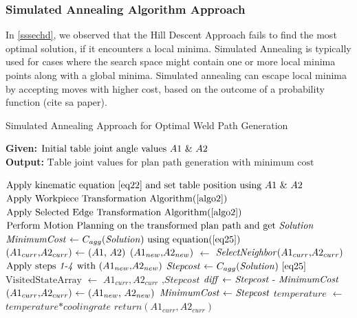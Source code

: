 \subsubsection{Simulated Annealing Algorithm Approach}
\label{sssec:sa}
In \ref{sssechd}, we observed that the Hill Descent Approach fails to find the most optimal solution, if it encounters a local minima. Simulated Annealing is typically used for cases where the search space might contain one or more local minima points along with a global minima. Simulated annealing can escape local minima by accepting moves with higher cost, based on the outcome of a probability function (cite sa paper). 
\begin{algorithm}[!ht]
	\caption{Simulated Annealing Approach for Optimal Weld Path Generation}
	\label{algo5}
	\textbf{Given:} $ \text{Initial table joint angle values \textit{$A1$} \& \textit{$A2$}}$ \\ 
	\textbf{Output:} $ \text{Table joint values for plan path generation with minimum cost}$
	
	\begin{algorithmic}[1]
		\State $\text{Apply kinematic equation \ref{eq22} and set table position using \textit{$A1$} \& \textit{$A2$}}$
		\State $\text{Apply Workpiece Transformation Algorithm(\ref{algo2})}$
		\State $\text{Apply Selected Edge Transformation Algorithm(\ref{algo2})}$
		\State $\text{Perform Motion Planning on the transformed plan path and get \textit{Solution}}$
		\State $\text{\textit{MinimumCost} $\gets$ $C_{agg}$(\textit{Solution}) using equation(\ref{eq25})}$
		\State $\text{(\textit{$A1_{curr}$},\textit{$A2_{curr}$}) $\gets$ (\textit{$A1$}, \textit{$A2$})}$
		\State $\text{(\textit{$A1_{new}$},\textit{$A2_{new}$})}$ $\gets$ $\text{\textit{SelectNeighbor}(\textit{$A1_{curr}$},\textit{$A2_{curr}$})}$
		\State $\text{Apply steps \textit{1-4} with (\textit{$A1_{new}$},\textit{$A2_{new}$})}$
		\State $\text{\textit{Stepcost} $\gets$ $C_{agg}$(\textit{Solution}) \ref{eq25}}$
		\State $\text{VisitedStateArray}$ $\gets$ $\textit{$A1_{curr}$},\textit{$A2_{curr}$}$ $\textit{,Stepcost}$ 
		\State $\text{\textit{diff} $\gets$ \textit{Stepcost} - \textit{MinimumCost}}$
		\State $\text{(\textit{$A1_{curr}$},\textit{$A2_{curr}$}) $\gets$ (\textit{$A1_{new}$}, \textit{$A2_{new}$})}$
		\State $\text{\textit{MinimumCost} $\gets$ \textit{Stepcost}}$
		\EndIf
		\State $\textit{temperature}$ $\gets$ $\textit{temperature*coolingrate}$
		\EndWhile %
		\State $\textit{return} (\textit{$A1_{curr}$},\textit{$A2_{curr}$})$      
	\end{algorithmic}
\end{algorithm}\\
